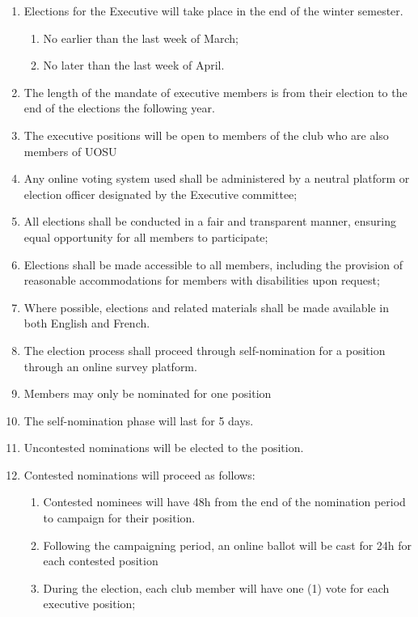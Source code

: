 \begin{enumerate}
    \item Elections for the Executive will take place in the end of the winter semester.
    \begin{enumerate}
        \item No earlier than the last week of March;
        \item No later than the last week of April.
    \end{enumerate}
    \item The length of the mandate of executive members is from their election to the end of the elections the following year.
     \item The executive positions will be open to members of the club who are also members of UOSU
    \item Any online voting system used shall be administered by a neutral platform or election officer designated by the Executive committee;
     \item All elections shall be conducted in a fair and transparent manner, ensuring equal opportunity for all members to participate;
     \item Elections shall be made accessible to all members, including the provision of reasonable accommodations for members with disabilities upon request;
     \item Where possible, elections and related materials shall be made available in both English and French.
     \item The election process shall proceed through self-nomination for a position through an online survey platform. 
     \item Members may only be nominated for one position
     \item The self-nomination phase will last for 5 days.
     \item Uncontested nominations will be elected to the position.
     \item Contested nominations will proceed as follows:
         \begin{enumerate}
             \item Contested nominees will have 48h from the end of the nomination period to campaign for their position. 
             \item Following the campaigning period, an online ballot will be cast for 24h for each contested position
             \item During the election, each club member will have one (1) vote for each executive position; 

\end{enumerate}
\end{enumerate}
